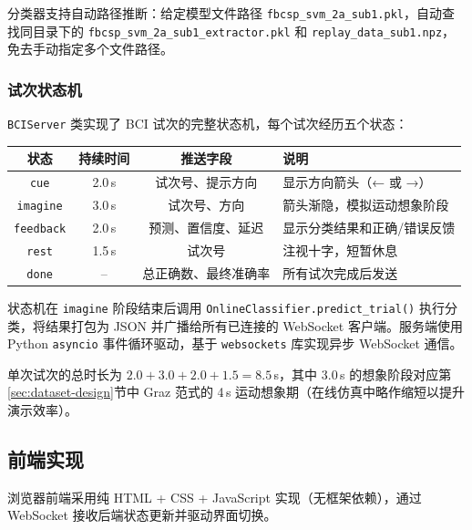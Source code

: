 分类器支持自动路径推断：给定模型文件路径 \texttt{fbcsp\_svm\_2a\_sub1.pkl}，自动查找同目录下的 \texttt{fbcsp\_svm\_2a\_sub1\_extractor.pkl} 和 \texttt{replay\_data\_sub1.npz}，免去手动指定多个文件路径。

\subsubsection{试次状态机}

\texttt{BCIServer} 类实现了 BCI 试次的完整状态机，每个试次经历五个状态：

\begin{table}[htbp]
	\centering
	\begin{tabular}{cccl}
		\toprule
		状态 & 持续时间 & 推送字段 & 说明 \\
		\midrule
		\texttt{cue} & 2.0\,s & 试次号、提示方向 & 显示方向箭头（← 或 →） \\
		\texttt{imagine} & 3.0\,s & 试次号、方向 & 箭头渐隐，模拟运动想象阶段 \\
		\texttt{feedback} & 2.0\,s & 预测、置信度、延迟 & 显示分类结果和正确/错误反馈 \\
		\texttt{rest} & 1.5\,s & 试次号 & 注视十字，短暂休息 \\
		\texttt{done} & -- & 总正确数、最终准确率 & 所有试次完成后发送 \\
		\bottomrule
	\end{tabular}
\end{table}

状态机在 \texttt{imagine} 阶段结束后调用 \texttt{OnlineClassifier.predict\_trial()} 执行分类，将结果打包为 JSON 并广播给所有已连接的 WebSocket 客户端。服务端使用 Python \texttt{asyncio} 事件循环驱动，基于 \texttt{websockets} 库实现异步 WebSocket 通信。

单次试次的总时长为 $2.0 + 3.0 + 2.0 + 1.5 = 8.5$\,s，其中 3.0\,s 的想象阶段对应第\ref{sec:dataset-design}节中 Graz 范式的 4\,s 运动想象期（在线仿真中略作缩短以提升演示效率）。

\subsection{前端实现}
\label{sec:online-frontend}

浏览器前端采用纯 HTML + CSS + JavaScript 实现（无框架依赖），通过 WebSocket 接收后端状态更新并驱动界面切换。

